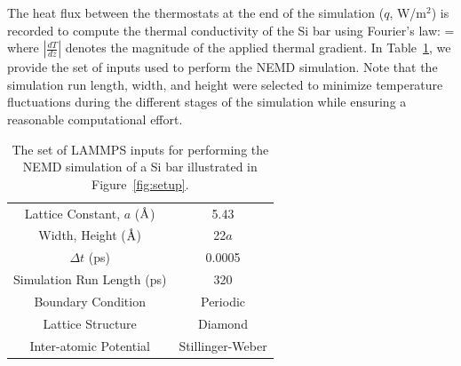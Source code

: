 %
The heat flux between the thermostats at the end of the simulation ($q$, W/m$^2$) is recorded to compute the
thermal conductivity of the Si bar using Fourier's law:
%
\be
 \kappa =  
\ee
%
where $\left|\frac{dT}{dz}\right|$ denotes the magnitude of the applied thermal gradient. In Table~\ref{tab:input},
we provide the set of inputs used to perform the NEMD simulation. Note that the simulation run length, width, 
and height were selected to minimize temperature fluctuations during the different stages of the simulation while
ensuring a reasonable computational effort. 
%
\begin{table}[htbp]
\centering
{}
\begin{tabular}{@{}cc@{}}\toprule
Lattice Constant, $a$ ($\mbox{\normalfont\AA}$) & 5.43 \\ 
Width, Height ($\mbox{\normalfont\AA}$) & 22$a$ \\
$\Delta t$  (ps) & 0.0005 \\ 
Simulation Run Length (ps) & 320 \\ 
Boundary Condition & Periodic \\ 
Lattice Structure & Diamond \\
Inter-atomic Potential & Stillinger-Weber \\ 
\bottomrule
\end{tabular}
\caption{The set of LAMMPS inputs for performing the NEMD simulation of a Si bar illustrated in Figure~\ref{fig:setup}.}
\label{tab:input}
\end{table}
 
